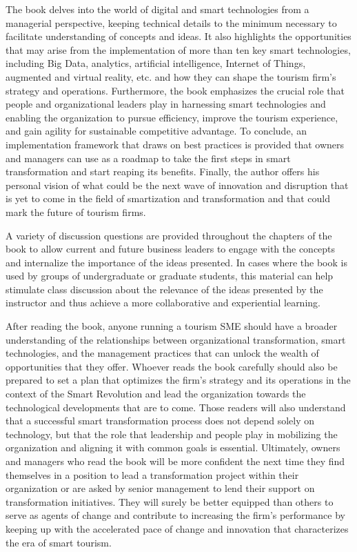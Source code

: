 \documentclass[
  letterpaper,
  DIV=11,
  numbers=noendperiod]{scrreprt}
\begin{document}
The book delves into the world of digital and smart technologies from a
managerial perspective, keeping technical details to the minimum
necessary to facilitate understanding of concepts and ideas. It also
highlights the opportunities that may arise from the implementation of
more than ten key smart technologies, including Big Data, analytics,
artificial intelligence, Internet of Things, augmented and virtual
reality, etc. and how they can shape the tourism firm's strategy and
operations. Furthermore, the book emphasizes the crucial role that
people and organizational leaders play in harnessing smart technologies
and enabling the organization to pursue efficiency, improve the tourism
experience, and gain agility for sustainable competitive advantage. To
conclude, an implementation framework that draws on best practices is
provided that owners and managers can use as a roadmap to take the first
steps in smart transformation and start reaping its benefits. Finally,
the author offers his personal vision of what could be the next wave of
innovation and disruption that is yet to come in the field of
smartization and transformation and that could mark the future of
tourism firms.

A variety of discussion questions are provided throughout the chapters
of the book to allow current and future business leaders to engage with
the concepts and internalize the importance of the ideas presented. In
cases where the book is used by groups of undergraduate or graduate
students, this material can help stimulate class discussion about the
relevance of the ideas presented by the instructor and thus achieve a
more collaborative and experiential learning.

After reading the book, anyone running a tourism SME should have a
broader understanding of the relationships between organizational
transformation, smart technologies, and the management practices that
can unlock the wealth of opportunities that they offer. Whoever reads
the book carefully should also be prepared to set a plan that optimizes
the firm's strategy and its operations in the context of the Smart
Revolution and lead the organization towards the technological
developments that are to come. Those readers will also understand that a
successful smart transformation process does not depend solely on
technology, but that the role that leadership and people play in
mobilizing the organization and aligning it with common goals is
essential. Ultimately, owners and managers who read the book will be
more confident the next time they find themselves in a position to lead
a transformation project within their organization or are asked by
senior management to lend their support on transformation initiatives.
They will surely be better equipped than others to serve as agents of
change and contribute to increasing the firm's performance by keeping up
with the accelerated pace of change and innovation that characterizes
the era of smart tourism.
\end{document}
